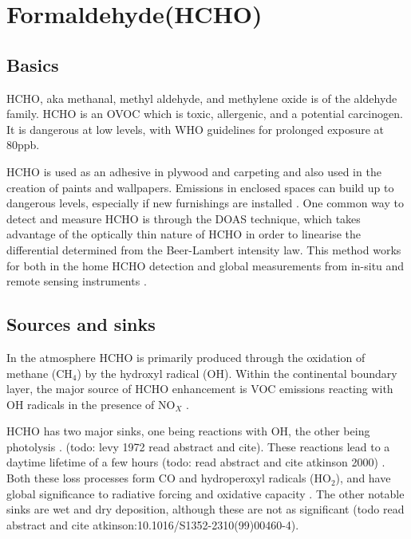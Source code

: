 \section{Formaldehyde(HCHO)}
\label{ch1:sec:HCHO}
  
  \subsection{Basics}
    HCHO, aka methanal, methyl aldehyde, and methylene oxide is of the aldehyde family.
    HCHO is an OVOC which is toxic, allergenic, and a potential carcinogen. 
    It is dangerous at low levels, with WHO guidelines for prolonged exposure at 80ppb.
    
    HCHO is used as an adhesive in plywood and carpeting and also used in the creation of paints and wallpapers.
    Emissions in enclosed spaces can build up to dangerous levels, especially if new furnishings are installed \citep{Davenport2015}.
    One common way to detect and measure HCHO is through the DOAS technique, which takes advantage of the optically thin nature of HCHO in order to linearise the differential determined from the Beer-Lambert intensity law.
    This method works for both in the home HCHO detection and global measurements from in-situ and remote sensing instruments \citep{Guenther1995, Abad2015,Davenport2015}.
    
  \subsection{Sources and sinks}
    In the atmosphere HCHO is primarily produced through the oxidation of methane (CH$_4$) by the hydroxyl radical (OH).
    Within the continental boundary layer, the major source of HCHO enhancement is VOC emissions reacting with OH radicals in the presence of NO$_X$ \citep{Wagner2002, Millet2006}.
    
    HCHO has two major sinks, one being reactions with OH, the other being photolysis \citep{Crutzen1999, Wagner2002, Levy1972}.
    (todo: levy 1972 read abstract and cite).
    These reactions lead to a daytime lifetime of a few hours (todo: read abstract and cite atkinson 2000) \citep{Millet2006}.
    Both these loss processes form CO and hydroperoxyl radicals (HO$_2$), and have global significance to radiative forcing and oxidative capacity \citep{Franco2015}.
    The other notable sinks are wet and dry deposition, although these are not as significant \citep{Atkinson2000} (todo read abstract and cite atkinson:10.1016/S1352-2310(99)00460-4).
    
